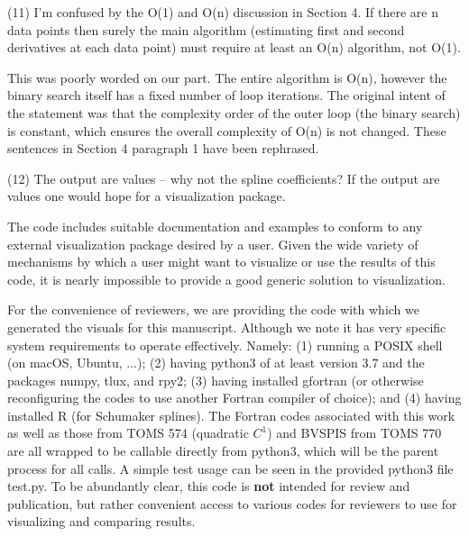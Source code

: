 \goodbreak
{\parindent=20pt \it
  
\item{(11)} I'm confused by the O(1) and O(n) discussion in Section 4.
  If there are n data points then surely the main algorithm
  (estimating first and second derivatives at each data point) must
  require at least an O(n) algorithm, not O(1).

}

This was poorly worded on our part. The entire algorithm is O(n),
however the binary search itself has a fixed number of loop
iterations. The original intent of the statement was that the
complexity order of the outer loop (the binary search) is constant,
which ensures the overall complexity of O(n) is not changed. These
sentences in Section 4 paragraph 1 have been rephrased.


\goodbreak
{\parindent=20pt \it
  
\item{(12)} The output are values -- why not the spline coefficients? If
  the output are values one would hope for a visualization package.

}

The code includes suitable documentation and examples to conform to
any external visualization package desired by a user. Given the wide
variety of mechanisms by which a user might want to visualize or use
the results of this code, it is nearly impossible to provide a good
generic solution to visualization.

For the convenience of reviewers, we are providing the code with which
we generated the visuals for this manuscript. Although we note it has
very specific system requirements to operate effectively. Namely: (1)
running a POSIX shell (on macOS, Ubuntu, $\ldots$); (2) having
{\ttVIII python3} of at least version $3.7$ and the packages {\ttVIII
  numpy}, {\ttVIII tlux}, and {\ttVIII rpy2}; (3) having installed
{\ttVIII gfortran} (or otherwise reconfiguring the codes to use
another Fortran compiler of choice); and (4) having installed {\ttVIII
  R} (for Schumaker splines). The Fortran codes associated with this
work as well as those from TOMS 574 (quadratic $C^1$) and BVSPIS from
TOMS 770 are all wrapped to be callable directly from {\ttVIII
  python3}, which will be the parent process for all calls. A simple
test usage can be seen in the provided {\ttVIII python3} file {\ttVIII
  test.py}. To be abundantly clear, this code is {\bf not} intended
for review and publication, but rather convenient access to various
codes for reviewers to use for visualizing and comparing results.


